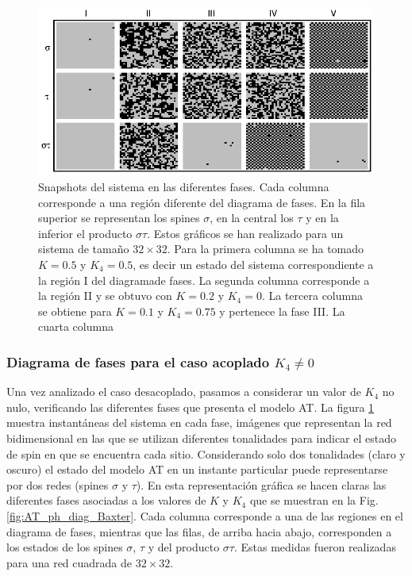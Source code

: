 \begin{figure}[h!]
\begin{center}
\includegraphics[scale=1]{graf/phases/multi_snaps32_horiz.eps}
\end{center}
\caption{Snapshots del sistema en las diferentes fases. Cada columna corresponde a una región diferente del diagrama de fases.
 En la fila superior se representan los spines $\sigma$, en la central los $\tau$ y en la inferior el producto $\sigma\tau$.
 Estos gráficos se han realizado para un sistema de tamaño $32\times 32$. Para la primera columna se ha tomado $K=0.5$ y $K_{4}=0.5$,
  es decir un estado del sistema correspondiente a la región I del diagramade fases. La segunda columna corresponde a la región II y se obtuvo con $K=0.2$ y $K_{4}=0$.
  La tercera columna se obtiene para $K=0.1$ y $K_{4}=0.75$ y pertenece la fase III. La cuarta columna }
\label{fig:snaps_multi}
\end{figure} 

\subsubsection{Diagrama de fases para el caso acoplado $K_{4}\neq 0$}

Una vez analizado el caso desacoplado, pasamos a considerar un valor de $K_{4}$ no nulo, verificando las diferentes fases que presenta el modelo AT.
La figura \ref{fig:snaps_multi} muestra instantáneas del sistema en cada fase, imágenes que representan la red bidimensional en las que se utilizan diferentes tonalidades
 para indicar el estado de spin en que se encuentra cada sitio. Considerando solo dos tonalidades (claro y oscuro) el estado del modelo AT en un instante particular
 puede representarse por dos redes (spines $\sigma$ y $\tau$). En esta representación gráfica se hacen claras las diferentes fases asociadas a los valores de $K$ y $K_{4}$
 que se muestran en la Fig. \ref{fig:AT_ph_diag_Baxter}.
Cada columna corresponde a una de las regiones en el diagrama de fases, mientras que las filas, de arriba hacia abajo, corresponden a los estados de los spines
 $\sigma$, $\tau$ y del producto $\sigma\tau$. Estas medidas fueron realizadas para una red cuadrada de $32\times 32$.\\

